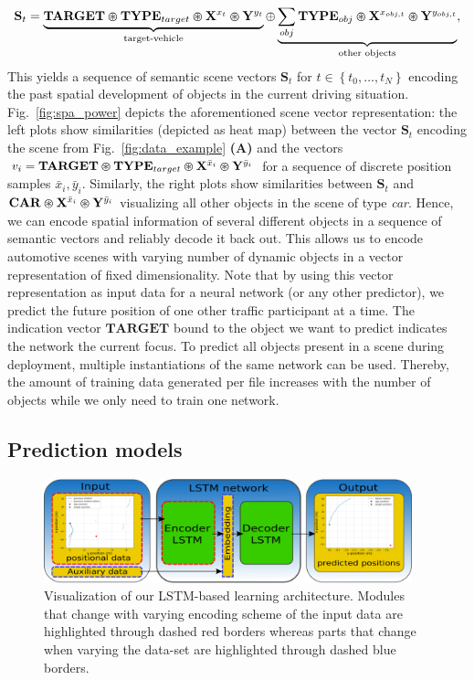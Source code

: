 \begin{equation}
	\label{eq:conv_power_enc}
  \mathbf{S}_{t} = \underbrace{\mathbf{TARGET}\varoast \mathbf{TYPE}_{target} \varoast \mathbf{X}^{x_{t}} \varoast \mathbf{Y}^{y_{t}}}_{\textrm{target-vehicle}} \oplus \underbrace{\sum_{obj} \mathbf{TYPE}_{obj} \varoast \mathbf{X}^{x_{obj,t}} \varoast \mathbf{Y}^{y_{obj,t}}}_{\textrm{other objects}},
\end{equation}
This yields a sequence of semantic scene vectors $\mathbf{S}_{t}$ for $t \in \left\{t_{0}, \ldots, t_{N} \right\}$ encoding the past spatial development of objects in the current driving situation.
Fig.~\ref{fig:spa_power} depicts the aforementioned scene vector representation: the left plots show similarities (depicted as heat map) between the vector $\mathbf{S}_{t}$ encoding the scene from Fig.~\ref{fig:data_example} \textbf{(A)} and the vectors $v_{i}=\mathbf{TARGET}\varoast \mathbf{TYPE}_{target} \varoast \mathbf{X}^{\bar{x}_{i}} \varoast \mathbf{Y}^{\bar{y}_{i}}$ for a sequence of discrete position samples ${\bar{x}_{i}, \bar{y}_{i}}$.
Similarly, the right plots show similarities between $\mathbf{S}_{t}$ and $\mathbf{CAR} \varoast \mathbf{X}^{\bar{x}_{i}} \varoast \mathbf{Y}^{\bar{y}_{i}}$ visualizing all other objects in the scene of type \emph{car}.
Hence, we can encode spatial information of several different objects in a sequence of semantic vectors and reliably decode it back out.
This allows us to encode automotive scenes with varying number of dynamic objects in a vector representation of fixed dimensionality.
Note that by using this vector representation as input data for a neural network (or any other predictor), we predict the future position of one other traffic participant at a time.
The indication vector $\mathbf{TARGET}$ bound to the object we want to predict indicates the network the current focus.
To predict all objects present in a scene during deployment, multiple instantiations of the same network can be used.
Thereby, the amount of training data generated per file increases with the number of objects while we only need to train one network.

\subsection{Prediction models}
\label{subsec:pred_models}
\begin{figure}[t!]
  \centering
  \includegraphics[width=0.95\textwidth]{imgs/lstm_arch.eps}
  \caption{Visualization of our \ac{LSTM}-based learning architecture. Modules that change with varying encoding scheme of the input data are highlighted through dashed red borders whereas parts that change when varying the data-set are highlighted through dashed blue borders.}\label{fig:lstm_arch}
\end{figure}


